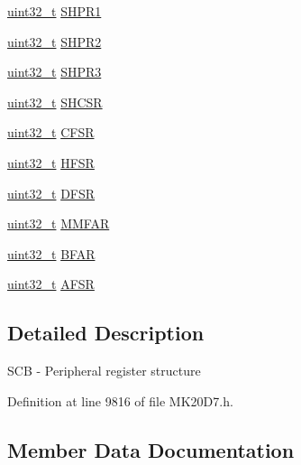 \begin{DoxyCompactItemize}
\item 
\hyperlink{_p_e___types_8h_a33594304e786b158f3fb30289278f5af}{uint32\+\_\+t} \hyperlink{struct_s_c_b___mem_map_afe02d5ca0102ec35b79172d453854ed0}{S\+H\+P\+R1}
\item 
\hyperlink{_p_e___types_8h_a33594304e786b158f3fb30289278f5af}{uint32\+\_\+t} \hyperlink{struct_s_c_b___mem_map_a1636322022eb10e4acedf40018708b68}{S\+H\+P\+R2}
\item 
\hyperlink{_p_e___types_8h_a33594304e786b158f3fb30289278f5af}{uint32\+\_\+t} \hyperlink{struct_s_c_b___mem_map_a8ac3a3b8dd23fb279640b98a95fb796a}{S\+H\+P\+R3}
\item 
\hyperlink{_p_e___types_8h_a33594304e786b158f3fb30289278f5af}{uint32\+\_\+t} \hyperlink{struct_s_c_b___mem_map_ae2b73d4b9744b878527466ec57dbfdb7}{S\+H\+C\+SR}
\item 
\hyperlink{_p_e___types_8h_a33594304e786b158f3fb30289278f5af}{uint32\+\_\+t} \hyperlink{struct_s_c_b___mem_map_a51c6a21cb789c655257efe5796c7f503}{C\+F\+SR}
\item 
\hyperlink{_p_e___types_8h_a33594304e786b158f3fb30289278f5af}{uint32\+\_\+t} \hyperlink{struct_s_c_b___mem_map_a7f0b5d6f24446f1f603a6d9ef6259de2}{H\+F\+SR}
\item 
\hyperlink{_p_e___types_8h_a33594304e786b158f3fb30289278f5af}{uint32\+\_\+t} \hyperlink{struct_s_c_b___mem_map_af178d6003a18eb7452c51edcec14ec5d}{D\+F\+SR}
\item 
\hyperlink{_p_e___types_8h_a33594304e786b158f3fb30289278f5af}{uint32\+\_\+t} \hyperlink{struct_s_c_b___mem_map_af81b60a951ac45ddc8376500ed1580ef}{M\+M\+F\+AR}
\item 
\hyperlink{_p_e___types_8h_a33594304e786b158f3fb30289278f5af}{uint32\+\_\+t} \hyperlink{struct_s_c_b___mem_map_a57e3932788931280ee70b7389c4b23f4}{B\+F\+AR}
\item 
\hyperlink{_p_e___types_8h_a33594304e786b158f3fb30289278f5af}{uint32\+\_\+t} \hyperlink{struct_s_c_b___mem_map_aa02bdd6294d9240a566fe92085f62ae1}{A\+F\+SR}
\end{DoxyCompactItemize}


\subsection{Detailed Description}
S\+CB -\/ Peripheral register structure 

Definition at line 9816 of file M\+K20\+D7.\+h.



\subsection{Member Data Documentation}
